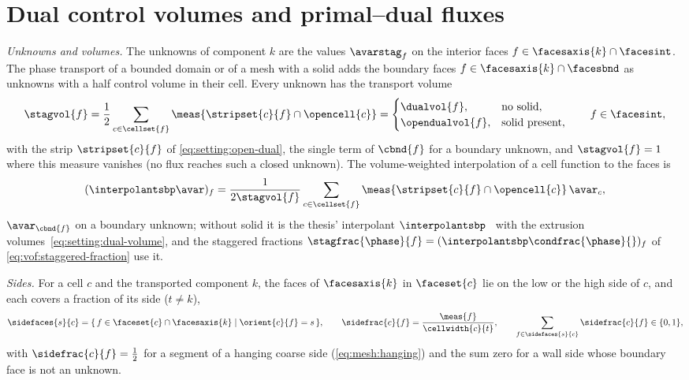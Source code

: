 \section{Dual control volumes and primal--dual fluxes}\label{sec:momentum:dual}
\emph{Unknowns and volumes.} The unknowns of component $k$ are the values
$\avarstag_f$ on the interior faces $f\in\facesaxis{k}\cap\facesint$. The
phase transport of a bounded domain or of a mesh with a solid adds the
boundary faces $f\in\facesaxis{k}\cap\facesbnd$ as unknowns with a half
control volume in their cell. Every unknown has the transport volume
\begin{equation}\label{eq:momentum:volumes}
  \stagvol{f}=\half\sum_{c\in\cellset{f}}\meas{\stripset{c}{f}\cap\opencell{c}}
  =\begin{cases}
    \dualvol{f}, & \text{no solid},\\
    \opendualvol{f}, & \text{solid present},
  \end{cases}
  \qquad f\in\facesint,
\end{equation}
with the strip $\stripset{c}{f}$ of \cref{eq:setting:open-dual}, the
single term of $\cbnd{f}$ for a boundary unknown, and $\stagvol{f}=1$ where
this measure vanishes (no flux reaches such a closed unknown). The
volume-weighted interpolation of a cell function to the faces is
\begin{equation}\label{eq:momentum:interpolation}
  (\interpolantsbp\avar)_f=\frac{1}{2\stagvol{f}}\sum_{c\in\cellset{f}}
    \meas{\stripset{c}{f}\cap\opencell{c}}\,\avar_c ,
\end{equation}
$\avar_{\cbnd{f}}$ on a boundary unknown; without solid it is the
thesis' interpolant $\interpolantsbp$~ with the
extrusion volumes~\cref{eq:setting:dual-volume}, and the staggered fractions
$\stagfrac{\phase}{f}=(\interpolantsbp\condfrac{\phase}{})_f$ of
\cref{eq:vof:staggered-fraction} use it.

\emph{Sides.} For a cell $c$ and the transported component $k$, the faces
of $\facesaxis{k}$ in $\faceset{c}$ lie on the low or the high side of $c$,
and each covers a fraction of its side ($t\neq k$),
\begin{equation}\label{eq:momentum:sides}
  \sidefaces{s}{c}=\set{f\in\faceset{c}\cap\facesaxis{k}}{\orient{c}{f}=s},\qquad
  \sidefrac{c}{f}=\frac{\meas{f}}{\cellwidth{c}{t}},\qquad
  \sum_{f\in\sidefaces{s}{c}}\sidefrac{c}{f}\in\{0,1\},
\end{equation}
with $\sidefrac{c}{f}=\half$ for a segment of a hanging coarse side
(\cref{eq:mesh:hanging}) and the sum zero for a wall side whose boundary
face is not an unknown.

